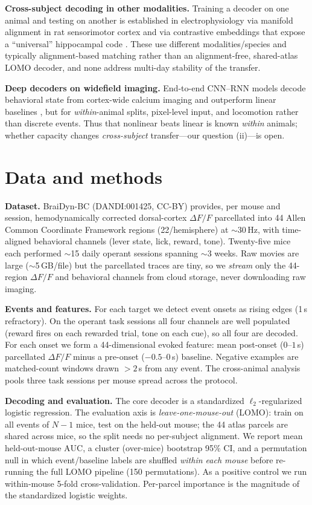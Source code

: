 \documentclass{article}
\newcommand{\auc}{\mathrm{AUC}}
\begin{document}
\textbf{Cross-subject decoding in other modalities.} Training a decoder on one animal and testing
on another is established in electrophysiology via manifold alignment in rat sensorimotor cortex
\citep{melbaum2022} and via contrastive embeddings that expose a ``universal'' hippocampal code
\citep{schneider2023}. These use different modalities/species and typically alignment-based
matching rather than an alignment-free, shared-atlas LOMO decoder, and none address multi-day
stability of the transfer.

\textbf{Deep decoders on widefield imaging.} End-to-end CNN--RNN models decode behavioral state
from cortex-wide calcium imaging and outperform linear baselines \citep{ajioka2024}, but for
\emph{within}-animal splits, pixel-level input, and locomotion rather than discrete events. Thus
that nonlinear beats linear is known \emph{within} animals; whether capacity changes
\emph{cross-subject} transfer---our question (ii)---is open.

\section{Data and methods}
\textbf{Dataset.} BraiDyn-BC \citep{kondo2025} (DANDI:001425, CC-BY) provides, per mouse and
session, hemodynamically corrected dorsal-cortex $\Delta F/F$ parcellated into 44 Allen Common
Coordinate Framework regions (22/hemisphere) at $\sim$30\,Hz, with time-aligned behavioral
channels (lever state, lick, reward, tone). Twenty-five mice each performed $\sim$15 daily
operant sessions spanning $\sim$3 weeks. Raw movies are large ($\sim$5\,GB/file) but the
parcellated traces are tiny, so we \emph{stream} only the 44-region $\Delta F/F$ and behavioral
channels from cloud storage, never downloading raw imaging.

\textbf{Events and features.} For each target we detect event onsets as rising edges (1\,s
refractory). On the operant task sessions all four channels are well populated (reward fires on
each rewarded trial, tone on each cue), so all four are decoded. For each onset we form a
44-dimensional evoked feature: mean post-onset ($0$--$1$\,s) parcellated $\Delta F/F$ minus a
pre-onset ($-0.5$--$0$\,s) baseline. Negative examples are matched-count windows drawn $>2$\,s
from any event. The cross-animal analysis pools three task sessions per mouse spread across the
protocol.

\textbf{Decoding and evaluation.} The core decoder is a standardized $\ell_2$-regularized logistic
regression. The evaluation axis is \emph{leave-one-mouse-out} (LOMO): train on all events of
$N{-}1$ mice, test on the held-out mouse; the 44 atlas parcels are shared across mice, so the
split needs no per-subject alignment. We report mean held-out-mouse $\auc$, a cluster
(over-mice) bootstrap 95\% CI, and a permutation null in which event/baseline labels are shuffled
\emph{within each mouse} before re-running the full LOMO pipeline (150 permutations). As a
positive control we run within-mouse 5-fold cross-validation. Per-parcel importance is the
magnitude of the standardized logistic weights.
\end{document}
